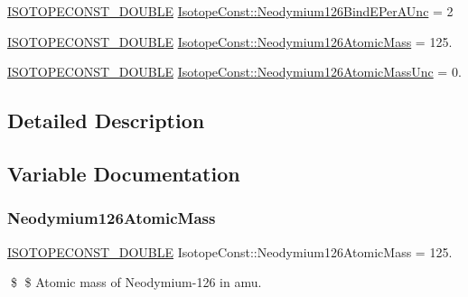 \begin{DoxyCompactItemize}
\mbox{\hyperlink{group___isotope_const-_macros_ga8f45a7272ce02c0b4c65c44636ed719a}{I\+S\+O\+T\+O\+P\+E\+C\+O\+N\+S\+T\+\_\+\+D\+O\+U\+B\+LE}} \mbox{\hyperlink{group___isotope_const-_neodymium-_nd126_ga50dd934c1552deaf977dd3180d246eb3}{Isotope\+Const\+::\+Neodymium126\+Bind\+E\+Per\+A\+Unc}} = 2
\item 
\mbox{\hyperlink{group___isotope_const-_macros_ga8f45a7272ce02c0b4c65c44636ed719a}{I\+S\+O\+T\+O\+P\+E\+C\+O\+N\+S\+T\+\_\+\+D\+O\+U\+B\+LE}} \mbox{\hyperlink{group___isotope_const-_neodymium-_nd126_ga738889586de4187c229907b0739c54c3}{Isotope\+Const\+::\+Neodymium126\+Atomic\+Mass}} = 125.
\item 
\mbox{\hyperlink{group___isotope_const-_macros_ga8f45a7272ce02c0b4c65c44636ed719a}{I\+S\+O\+T\+O\+P\+E\+C\+O\+N\+S\+T\+\_\+\+D\+O\+U\+B\+LE}} \mbox{\hyperlink{group___isotope_const-_neodymium-_nd126_gafeb930b562d55ff613e8cb5ea4c52667}{Isotope\+Const\+::\+Neodymium126\+Atomic\+Mass\+Unc}} = 0.
\end{DoxyCompactItemize}


\subsection{Detailed Description}


\subsection{Variable Documentation}
\mbox{\label{group___isotope_const-_neodymium-_nd126_ga738889586de4187c229907b0739c54c3}} 
\subsubsection{\texorpdfstring{Neodymium126\+Atomic\+Mass}{Neodymium126AtomicMass}}
{\footnotesize\ttfamily \mbox{\hyperlink{group___isotope_const-_macros_ga8f45a7272ce02c0b4c65c44636ed719a}{I\+S\+O\+T\+O\+P\+E\+C\+O\+N\+S\+T\+\_\+\+D\+O\+U\+B\+LE}} Isotope\+Const\+::\+Neodymium126\+Atomic\+Mass = 125.}

\$ \$ Atomic mass of Neodymium-\/126 in amu. \mbox{\label{group___isotope_const-_neodymium-_nd126_gafeb930b562d55ff613e8cb5ea4c52667}} 
